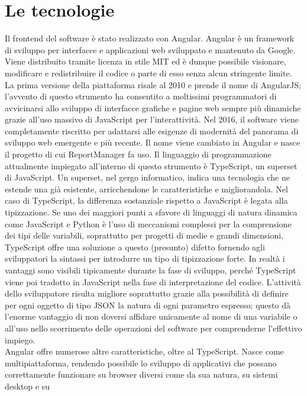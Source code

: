 \chapter{Le tecnologie}\label{c:technologies}

Il frontend del software è stato realizzato con Angular.
Angular è un framework di sviluppo per interfacce e applicazioni web sviluppato e mantenuto da Google.
Viene distribuito tramite licenza in stile MIT ed è dunque possibile visionare, modificare e redistribuire il codice o parte di esso senza alcun stringente limite.
La prima versione della piattaforma risale al 2010 e prende il nome di AngularJS; l'avvento di questo strumento ha consentito a moltissimi programmatori di avvicinarsi
allo sviluppo di interfacce grafiche e pagine web sempre più dinamiche grazie all'uso massivo di JavaScript per l'interattività.
Nel 2016, il software viene completamente riscritto per adattarsi alle esigenze di modernità del panorama di sviluppo web emergente e più recente.
Il nome viene cambiato in Angular e nasce il progetto di cui ReportManager fa uso.
Il linguaggio di programmazione attualmente impiegato all'interno di questo strumento è TypeScript, un superset di JavaScript.
Un superset, nel gergo informatico, indica una tecnologia che ne estende una già esistente, arricchendone le caratteristiche e migliorandola.
Nel caso di TypeScript, la differenza sostanziale rispetto a JavaScript è legata alla tipizzazione.
Se uno dei maggiori punti a sfavore di linguaggi di natura dinamica come JavaScript e Python è l'uso di meccanismi complessi per la comprensione dei tipi delle 
variabili, soprattutto per progetti di medie e grandi dimensioni, TypeScript offre una soluzione a questo (presunto) difetto fornendo agli sviluppatori la sintassi
per introdurre un tipo di tipizzazione forte.
In realtà i vantaggi sono visibili tipicamente durante la fase di sviluppo, perché TypeScript viene poi tradotto in JavaScript nella fase di interpretazione del codice.
L'attività dello sviluppatore risulta migliore soprattutto grazie alla possibilità di definire per ogni oggetto di tipo JSON la natura di ogni parametro espresso; questo 
dà l'enorme vantaggio di non doversi affidare unicamente al nome di una variabile o all'uso nello scorrimento delle operazioni del software per comprenderne l'effettivo impiego.
\\
Angular offre numerose altre caratteristiche, oltre al TypeScript.
Nasce come multipiattaforma, rendendo possibile lo sviluppo di applicativi che possano correttamente funzionare su browser diversi come da sua natura, su sistemi desktop e su 
